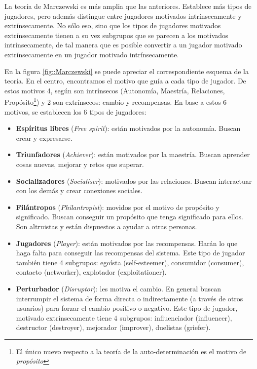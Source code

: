 La teoría de Marczewski  \cite{marczewski} es más amplia que las anteriores.
%
Establece más tipos de jugadores, pero además distingue entre jugadores motivados intrínsecamente y extrínsecamente.
%
No sólo eso, sino que los tipos de jugadores motivados extrínsecamente tienen a su vez subgrupos que se parecen a los motivados intrínsecamente, de tal manera que es posible convertir a un jugador motivado extrínsecamente en un jugador motivado intrínsecamente.

En la figura \ref{fig::Marczewski} se puede apreciar el correspondiente esquema de la teoría.
%
En el centro, encontramos el motivo que guía a cada tipo de jugador. 
%
De estos motivos 4, según  \cite{marczewski} son intrínsecos (Autonomía, Maestría, Relaciones, Propósito\footnote{El único nuevo respecto a la teoría de la auto-determinación  \cite{SDT} es el motivo de \textit{propósito}}) y 2 son extrínsecos: cambio y recompensas.
%
En base a estos 6 motivos, se establecen los 6 tipos de jugadores:
%
\begin{itemize}
	\item \textbf{Espíritus libres} (\textit{Free spirit}): están motivados por la autonomía. Buscan crear y expresarse.

	\item \textbf{Triunfadores} (\textit{Achiever}): están motivados por la maestría. 
	Buscan aprender cosas nuevas, mejorar y retos que superar.


	\item \textbf{Socializadores} (\textit{Socialiser}): motivados por las relaciones.
	Buscan interactuar con los demás y crear conexiones sociales.

	\item \textbf{Filántropos} (\textit{Philantropist}): movidos por el motivo de propósito y significado.
	Buscan conseguir un propósito que tenga  significado para ellos.
	Son altruistas y están dispuestos a ayudar a otras personas.


	\item \textbf{Jugadores} (\textit{Player}): están motivados por las recompensas. 
	Harán lo que haga falta para conseguir las recompensas del sistema.
	\subitem Este tipo de jugador también tiene 4 subgrupos: egoísta (self-esteemer), consumidor (consumer), contacto (networker), explotador (exploitationer).

	\item \textbf{Perturbador} (\textit{Disruptor}): les motiva el cambio. En general buscan interrumpir el sistema de forma directa o indirectamente (a través de otros usuarios) para forzar el cambio positivo o negativo.
	\subitem Este tipo de jugador, motivado extrínsecamente tiene 4 subgrupos: influenciador (influencer), destructor (destroyer), mejorador (improver), duelistas (griefer).
\end{itemize}

